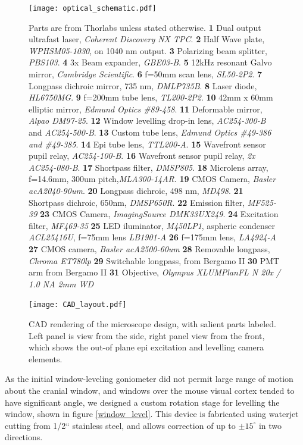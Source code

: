 \documentclass[a4paper,12pt]{article}
\begin{document}
\begin{figure}
\label{optical_schematic}
\centering
\texttt{[image: optical\_schematic.pdf]}
\caption{ Parts are from Thorlabs unless stated otherwise. 
\textbf{1} Dual output ultrafast laser, \textsl{Coherent Discovery NX TPC}. 
\textbf{2} Half Wave plate, \textsl{WPHSM05-1030}, on 1040 nm output. 
\textbf{3} Polarizing beam splitter, \textsl{PBS103}.
\textbf{4} 3x Beam expander, \textsl{GBE03-B}.
\textbf{5} 12kHz resonant Galvo mirror, \textsl{Cambridge Scientific}.
\textbf{6} f=50mm scan lens, \textsl{SL50-2P2}.
\textbf{7} Longpass dichroic mirror, 735 nm, \textsl{DMLP735B}.
\textbf{8} Laser diode, \textsl{HL6750MG}.
\textbf{9} f=200mm tube lens, \textsl{TL200-2P2}.
\textbf{10} 42mm x 60mm elliptic mirror, \textsl{Edmund Optics \#89-458}.
\textbf{11} Deformable mirror, \textsl{Alpao DM97-25}.
\textbf{12} Window levelling drop-in lens, \textsl{AC254-300-B} and \textsl{AC254-500-B}.
\textbf{13} Custom tube lens, \textsl{Edmund Optics \#49-386 and \#49-385}.
\textbf{14} Epi tube lens, \textsl{ TTL200-A}.
\textbf{15} Wavefront sensor pupil relay, \textsl{AC254-100-B}.
\textbf{16} Wavefront sensor pupil relay, \textsl{2x AC254-080-B}.
\textbf{17} Shortpass filter, \textsl{DMSP805}.
\textbf{18} Microlens array, f=14.6mm, 300um pitch,\textsl{MLA300-14AR}.
\textbf{19} CMOS Camera, \textsl{Basler acA2040-90um}.
\textbf{20} Longpass dichroic, 498 nm, \textsl{MD498}.
\textbf{21} Shortpass dichroic, 650nm, \textsl{DMSP650R}.
\textbf{22} Emission filter, \textsl{MF525-39}
\textbf{23} CMOS Camera, \textsl{ImagingSource DMK33UX249}.
\textbf{24} Excitation filter, \textsl{MF469-35}
\textbf{25} LED iluminator, \textsl{M450LP1}, aspheric condenser \textsl{ACL25416U}, f=75mm lens \textsl{LB1901-A}
\textbf{26} f=175mm lens, \textsl{LA4924-A}
\textbf{27} CMOS camera, \textsl{Basler acA2500-60um}
\textbf{28} Removable longpass, \textsl{Chroma ET780lp}
\textbf{29} Switchable longpass, from Bergamo II
\textbf{30} PMT arm from Bergamo II
\textbf{31} Objective, \textsl{Olympus XLUMPlanFL N 20x / 1.0 NA 2mm WD} 
}
\end{figure}

\begin{figure}
\label{CAD_layout}
\centering
\texttt{[image: CAD\_layout.pdf]}
\caption{CAD rendering of the microscope design, with salient parts labeled.  Left panel is view from the side, right panel view from the front, which shows the out-of plane epi excitation and levelling camera elements.  }
\end{figure}


As the initial window-leveling goniometer did not permit large range of motion about the cranial window, and windows over the mouse visual cortex tended to have significant angle, we designed a custom rotation stage for levelling the window, shown in figure \ref{window_level}.  This device is fabricated using waterjet cutting from 1/2`` stainless steel, and allows correction of up to $\pm 15^{\circ}$ in two directions. 
\end{document}
